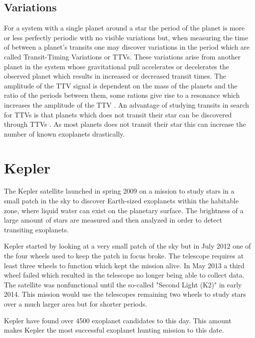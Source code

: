 \documentclass[12pt]{report}
\begin{document}
\subsection{Variations}
\label{sec:trans_vari}

	For a system with a single planet around a star the period of the planet is more or less perfectly periodic with no visible variations but, when measuring the time of between a planet's transits one may discover variations in the period which are called Transit-Timing Variations or TTVs. These variations arise from another planet in the system whose gravitational pull accelerates or decelerates the observed planet which results in increased or decreased transit times. The amplitude of the TTV signal is dependent on the mass of the planets and the ratio of the periods between them, some rations give rise to a resonance which increases the amplitude of the TTV \citep{0004-637X-688-1-636}. An advantage of studying transits in search for TTVs is that planets which does not transit their star can be discovered through TTVs \citep{0004-637X-777-1-3}. As most planets does not transit their star this can increase the number of known exoplanets drastically.

\section{Kepler}
	The Kepler satellite launched in spring 2009 on a mission to study stars in a small patch in the sky to discover Earth-sized exoplanets within the habitable zone, where liquid water can exist on the planetary surface. The brightness of a large amount of stars are measured and then analyzed in order to detect transiting exoplanets. 
	
	Kepler started by looking at a very small patch of the sky but in July 2012 one of the four wheels used to keep the patch in focus broke. The telescope requires at least three wheels to function which kept the mission alive. In May 2013 a third wheel failed which resulted in the telescope no longer being able to collect data. The satellite was nonfunctional until the so-called "Second Light (K2)" in early 2014. This mission would use the telescopes remaining two wheels to study stars over a much larger area but for shorter periods. \citep{2017PAPhS.161...38B}
	
	Kepler have found over 4500 exoplanet candidates \citep{2017PAPhS.161...38B} to this day. This amount makes Kepler the most successful exoplanet hunting mission to this date.
	
\end{document}

